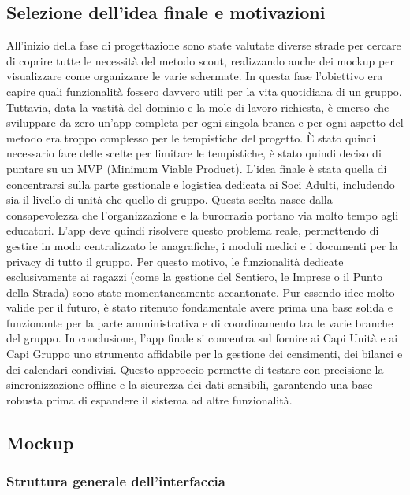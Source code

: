 \documentclass[11pt]{article}
\numberwithin{figure}{section}
\begin{document}
\subsection{Selezione dell'idea finale e motivazioni}
All'inizio della fase di progettazione sono state valutate diverse strade per cercare di coprire tutte le necessità del metodo scout, realizzando anche dei mockup per visualizzare come organizzare le varie schermate. In questa fase l'obiettivo era capire quali funzionalità fossero davvero utili per la vita quotidiana di un gruppo. Tuttavia, data la vastità del dominio e la mole di lavoro richiesta, è emerso che sviluppare da zero un'app completa per ogni singola branca e per ogni aspetto del metodo era troppo complesso per le tempistiche del progetto. È stato quindi necessario fare delle scelte per limitare le tempistiche, è stato quindi deciso di puntare su un MVP (Minimum Viable Product).  L'idea finale è stata quella di concentrarsi sulla parte gestionale e logistica dedicata ai Soci Adulti, includendo sia il livello di unità che quello di gruppo. Questa scelta nasce dalla consapevolezza che l'organizzazione e la burocrazia portano via molto tempo agli educatori. L'app deve quindi risolvere questo problema reale, permettendo di gestire in modo centralizzato le anagrafiche, i moduli medici e i documenti per la privacy di tutto il gruppo.  Per questo motivo, le funzionalità dedicate esclusivamente ai ragazzi (come la gestione del Sentiero, le Imprese o il Punto della Strada) sono state momentaneamente accantonate. Pur essendo idee molto valide per il futuro, è stato ritenuto fondamentale avere prima una base solida e funzionante per la parte amministrativa e di coordinamento tra le varie branche del gruppo.  In conclusione, l'app finale si concentra sul fornire ai Capi Unità e ai Capi Gruppo uno strumento affidabile per la gestione dei censimenti, dei bilanci e dei calendari condivisi. Questo approccio permette di testare con precisione la sincronizzazione offline e la sicurezza dei dati sensibili, garantendo una base robusta prima di espandere il sistema ad altre funzionalità.

\subsection{Mockup}
\subsubsection{Struttura generale dell'interfaccia}
\end{document}
